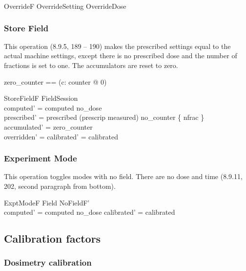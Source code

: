 \documentclass{article}
\begin{document}
\begin{zed} OverrideF  OverrideSetting \lor OverrideDose \end{zed}

\subsubsection{Store Field}

This operation (8.9.5, 189 -- 190) makes the prescribed settings equal
to the actual machine settings, except there is no prescribed dose and
the number of fractions is set to one.  The accumulators are reset to
zero.

\begin{zed}
	zero\_counter == (\lambda c: counter @ 0)
\end{zed}

\begin{schema}{StoreFieldF}
	\Delta FieldSession \\
\where
	computed' = computed \oplus no\_dose \\
	prescribed' = prescribed \oplus  (prescrip \dres measured) 
			\oplus no\_counter \oplus \{ nfrac  \} \\
	accumulated' = zero\_counter \\
	overridden' = \emptyset
\also
	calibrated' = calibrated \\
\end{schema}


\subsubsection{Experiment Mode}

This operation toggles modes with no field.  There are
no dose and time (8.9.11, 202, second paragraph from bottom).

\begin{schema}{ExptModeF}
	\Delta Field
\where
	NoFieldF' \\
	computed' = computed \oplus no\_dose
\also
	calibrated' = calibrated
\end{schema}

\subsection{Calibration factors}

\subsubsection{Dosimetry calibration}
\end{document}
